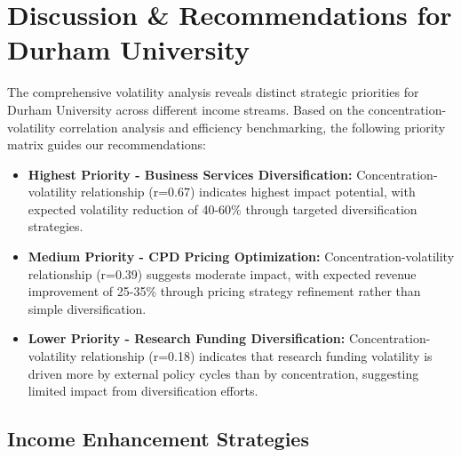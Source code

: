 \documentclass[journal,onecolumn, 10pt,draftclsnofoot]{IEEEtran}
\begin{document}
\section{Discussion \& Recommendations for Durham University}
The comprehensive volatility analysis reveals distinct strategic priorities for Durham University across different income streams. Based on the concentration-volatility correlation analysis and efficiency benchmarking, the following priority matrix guides our recommendations:

\begin{itemize}
    \item \textbf{Highest Priority - Business Services Diversification:} Concentration-volatility relationship (r=0.67) indicates highest impact potential, with expected volatility reduction of 40-60\% through targeted diversification strategies.
    
    \item \textbf{Medium Priority - CPD Pricing Optimization:} Concentration-volatility relationship (r=0.39) suggests moderate impact, with expected revenue improvement of 25-35\% through pricing strategy refinement rather than simple diversification.
    
    \item \textbf{Lower Priority - Research Funding Diversification:} Concentration-volatility relationship (r=0.18) indicates that research funding volatility is driven more by external policy cycles than by concentration, suggesting limited impact from diversification efforts.
\end{itemize}

\subsection{Income Enhancement Strategies}
\end{document}
